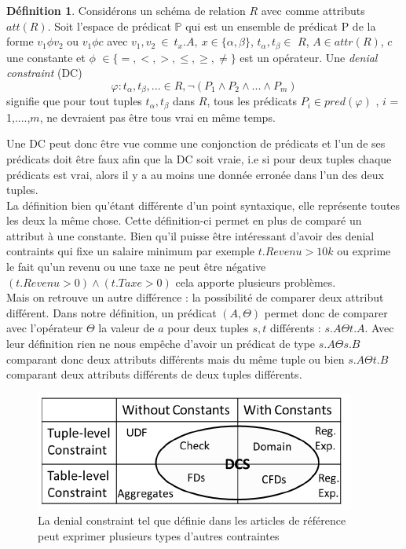 \documentclass[letterpaper, 12pt]{report}
\theoremstyle{definition}
\newtheorem{mydef}{Définition}
\begin{document}
\begin{mydef}
	Considérons un schéma de relation $R$ avec comme attributs $att(R)$. Soit l'espace de prédicat $\mathbb{P}$ qui est un ensemble de prédicat P de la forme $v_1 \phi v_2$ ou $v_1 \phi c$ avec $v_1,v_2\ \in \ t_x.A,\ x \in \{\alpha,\beta \}$, $t_\alpha,t_\beta \in$ $R$, $A \in attr(R)$, $c$ une constante et $\phi$ $\in \{=,<,>,\leq,\geq,\neq \} $ est un opérateur. Une \emph{denial constraint} (DC)
	$$ \varphi : t_\alpha,t_\beta,... \in R,\neg(P_1 \wedge P_2 \wedge ... \wedge P_m)$$
	signifie que pour tout tuples $t_\alpha,t_\beta$ dans $R$, tous les prédicats $P_i \in pred (\varphi)$ , $i$ = 1,....,$m$, ne devraient pas être tous vrai en même temps. 
\end{mydef}

Une DC peut donc être vue comme une conjonction de prédicats et l'un de ses prédicats doit être faux afin que la DC soit vraie, i.e si pour deux tuples chaque prédicats est vrai, alors il y a au moins une donnée erronée dans l'un des deux tuples.\\

La définition bien qu'étant différente d'un point syntaxique, elle représente toutes les deux la même chose. Cette définition-ci permet en plus de comparé un attribut à une constante. Bien qu'il puisse être intéressant d'avoir des denial contraints qui fixe un salaire minimum par exemple $t.Revenu > 10k$ ou exprime le fait qu'un revenu ou une taxe ne peut être négative $(t.Revenu >0) \wedge (t.Taxe >0)$ cela apporte plusieurs problèmes.\\

Mais on retrouve un autre différence : la possibilité de comparer deux attribut différent. Dans notre définition, un prédicat $(A,\Theta)$ permet donc de comparer avec l'opérateur $\Theta$ la valeur de $a$ pour deux tuples $s,t$ différents : $s.A \Theta t.A$. Avec leur définition rien ne nous empêche d'avoir un prédicat de type $s.A \Theta s.B$ comparant donc deux attributs différents mais du même tuple ou bien $s.A \Theta t.B$ comparant deux attributs différents de deux tuples différents. \\

\begin{figure}
	\centering
	\includegraphics[scale=1]{img/quadran.png}
	\caption{La denial constraint tel que définie dans les articles de référence peut exprimer plusieurs types d'autres contraintes \cite{DCs}}
\end{figure}
\end{document}
